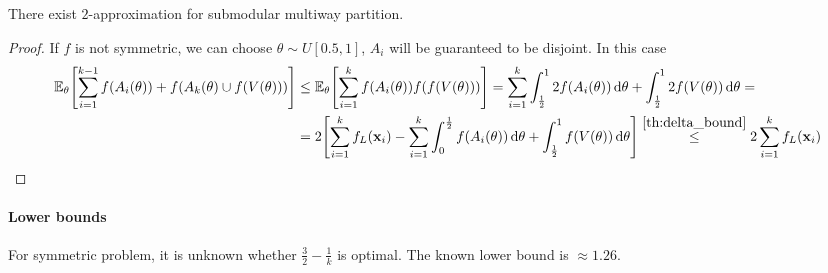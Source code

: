 \begin{theorem}
	There exist $2$-approximation for submodular multiway partition.
		\begin{proof}
If $f$ is not symmetric, we can choose $\theta\sim U[0.5,1]$, $A_i$ will be guaranteed to be disjoint. In this case
\begin{align}
\mathbb{E}_\theta \qty[\sum_{i=1}^{k-1} f(A_i(\theta)) + f(A_k(\theta) \cup f(V(\theta))) ] &\leq\mathbb{E}_\theta \qty[\sum_{i=1}^{k} f(A_i(\theta))  f(f(V(\theta))) ] = \sum_{i=1}^k \int_{\frac{1}{2}}^{1} 2 f(A_i(\theta))\dd{\theta} + \int_{\frac{1}{2}}^{1} 2 f(V(\theta)) \dd{\theta}  =\\&=
 2\qty[\sum_{i=1}^k f_L(\vb{x}_i) - \sum_{i=1}^k \int_0^{\frac{1}{2}}  f(A_i(\theta))\dd{\theta} + \int_{\frac{1}{2}}^{1}  f(V(\theta)) \dd{\theta}] \stackrel{\ref{th:delta_bound}}{\leq} 2 \sum_{i=1}^k f_L(\vb{x}_i)
\end{align}	\end{proof}
\end{theorem}

\paragraph{Lower bounds} For symmetric problem, it is unknown whether $\frac{3}{2} - \frac{1}{k}$ is optimal. The known lower bound is $\approx 1.26$.


